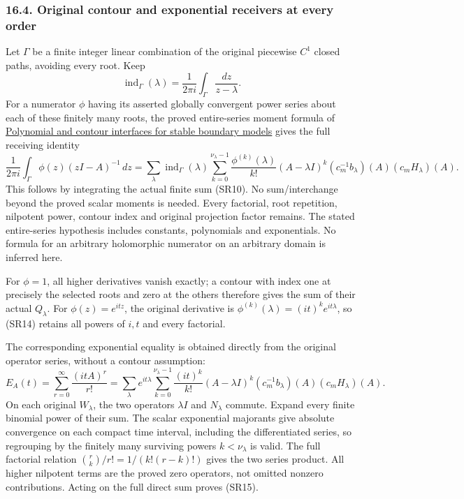 \documentclass[
  11pt,
]{article}
\begin{document}
\subsubsection{16.4. Original contour and exponential receivers at every
order}\label{original-contour-and-exponential-receivers-at-every-order}

Let \(\Gamma\) be a finite integer linear combination of the original
piecewise \(C^1\) closed paths, avoiding every root. Keep \[
 \operatorname{ind}_\Gamma(\lambda)
       =\frac{1}{2\pi i}\int_\Gamma\frac{dz}{z-\lambda}.        \tag{SR13}
\] For a numerator \(\phi\) having its asserted globally convergent
power series about each of these finitely many roots, the proved
entire-series moment formula of
\href{stable-prerequisite-bridges.pdf}{Polynomial and contour interfaces
for stable boundary models} gives the full receiving identity \[
 \frac{1}{2\pi i}\int_\Gamma\phi(z)(zI-A)^{-1}\,dz
 =\sum_\lambda\operatorname{ind}_\Gamma(\lambda)
    \sum_{k=0}^{\nu_\lambda-1}\frac{\phi^{(k)}(\lambda)}{k!}
        (A-\lambda I)^k
        (c_m^{-1}b_\lambda)(A)(c_mH_\lambda)(A).               \tag{SR14}
\] This follows by integrating the actual finite sum (SR10). No
sum/interchange beyond the proved scalar moments is needed. Every
factorial, root repetition, nilpotent power, contour index and original
projection factor remains. The stated entire-series hypothesis includes
constants, polynomials and exponentials. No formula for an arbitrary
holomorphic numerator on an arbitrary domain is inferred here.

For \(\phi=1\), all higher derivatives vanish exactly; a contour with
index one at precisely the selected roots and zero at the others
therefore gives the sum of their actual \(Q_\lambda\). For
\(\phi(z)=e^{itz}\), the original derivative is
\(\phi^{(k)}(\lambda)=(it)^k e^{it\lambda}\), so (SR14) retains all
powers of \(i,t\) and every factorial.

The corresponding exponential equality is obtained directly from the
original operator series, without a contour assumption: \[
 E_A(t)=\sum_{r=0}^{\infty}\frac{(itA)^r}{r!}
       =\sum_\lambda e^{it\lambda}
          \sum_{k=0}^{\nu_\lambda-1}\frac{(it)^k}{k!}
            (A-\lambda I)^k
            (c_m^{-1}b_\lambda)(A)(c_mH_\lambda)(A).          \tag{SR15}
\] On each original \(W_\lambda\), the two operators \(\lambda I\) and
\(N_\lambda\) commute. Expand every finite binomial power of their sum.
The scalar exponential majorants give absolute convergence on each
compact time interval, including the differentiated series, so
regrouping by the finitely many surviving powers \(k<\nu_\lambda\) is
valid. The full factorial relation \(\binom{r}{k}/r!=1/(k!(r-k)!)\)
gives the two series product. All higher nilpotent terms are the proved
zero operators, not omitted nonzero contributions. Acting on the full
direct sum proves (SR15).
\end{document}
